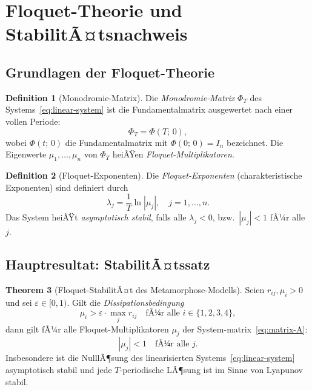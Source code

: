 ﻿\documentclass[12pt, a4paper]{article}
\theoremstyle{definition}
\newtheorem{theorem}{Theorem}[section]
\newtheorem{definition}[theorem]{Definition}
\begin{document}
\section{Floquet-Theorie und StabilitÃ¤tsnachweis}

\subsection{Grundlagen der Floquet-Theorie}

\begin{definition}[Monodromie-Matrix]\label{def:monodromy}
Die \emph{Monodromie-Matrix} $\Phi_T$ des Systems~\eqref{eq:linear-system} ist
die Fundamentalmatrix ausgewertet nach einer vollen Periode:
\[
  \Phi_T = \Phi(T;\,0),
\]
wobei $\Phi(t;\,0)$ die Fundamentalmatrix mit $\Phi(0;\,0) = I_n$ bezeichnet.
Die Eigenwerte $\mu_1, \ldots, \mu_n$ von $\Phi_T$ heiÃŸen \emph{Floquet-Multiplikatoren}.
\end{definition}

\begin{definition}[Floquet-Exponenten]\label{def:floquet-exp}
Die \emph{Floquet-Exponenten} (charakteristische Exponenten) sind definiert durch
\[
  \lambda_j = \frac{1}{T}\ln|\mu_j|, \quad j = 1, \ldots, n.
\]
Das System heiÃŸt \emph{asymptotisch stabil}, falls alle $\lambda_j < 0$, bzw.\
$|\mu_j| < 1$ fÃ¼r alle $j$.
\end{definition}

\subsection{Hauptresultat: StabilitÃ¤tssatz}

\begin{theorem}[Floquet-StabilitÃ¤t des Metamorphose-Modells]\label{thm:floquet}
Seien $r_{ij}, \mu_i > 0$ und sei $\varepsilon \in [0, 1)$. Gilt die
\emph{Dissipationsbedingung}
\begin{equation}\label{eq:dissipation}
  \mu_i > \varepsilon \cdot \max_{j} r_{ij} \quad \text{fÃ¼r alle } i \in \{1,2,3,4\},
\end{equation}
dann gilt fÃ¼r alle Floquet-Multiplikatoren $\mu_j$ der System-matrix~\eqref{eq:matrix-A}:
\[
  |\mu_j| < 1 \quad \text{fÃ¼r alle } j.
\]
Insbesondere ist die NulllÃ¶sung des linearisierten Systems~\eqref{eq:linear-system}
asymptotisch stabil und jede $T$-periodische LÃ¶sung ist im Sinne von Lyapunov
stabil.
\end{theorem}
\end{document}

